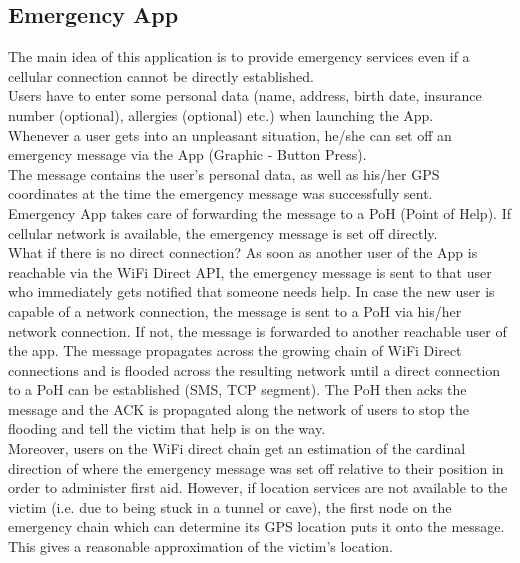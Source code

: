\subsection{Emergency App}
The main idea of this application is to provide emergency services even if a cellular connection cannot be directly established. \\
Users have to enter some personal data (name, address, birth date, insurance number (optional), allergies (optional) etc.) when launching the App. \\
Whenever a user gets into an unpleasant situation, he/she can set off an emergency message via the App (Graphic - Button Press). \\
The message contains the user's personal data, as well as his/her GPS coordinates at the time the emergency message was successfully sent. \\
Emergency App takes care of forwarding the message to a PoH (Point of Help). If cellular network is available, the emergency message is set off directly. \\
What if there is no direct connection? As soon as another user of the App is reachable via the WiFi Direct API, the emergency message is sent to that user who immediately gets notified that someone needs help. In case the new user is capable of a network connection, the message is sent to a PoH via his/her network connection. If not, the message is forwarded to another reachable user of the app. The message propagates across the growing chain of WiFi Direct connections and is flooded across the resulting network until a direct connection to a PoH can be established (SMS, TCP segment). The PoH then acks the message and the ACK is propagated along the network of users to stop the flooding and tell the victim that help is on the way. \\
Moreover, users on the WiFi direct chain get an estimation of the cardinal direction of where the emergency message was set off relative to their position in order to administer first aid.
However, if location services are not available to the victim (i.e. due to being stuck in a tunnel or cave), the first node on the emergency chain which can determine its GPS location puts it onto the message. This gives a reasonable approximation of the victim's location. \\
		
